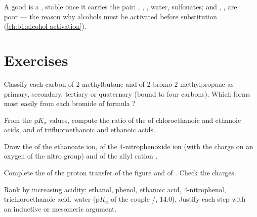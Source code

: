 A good  is a , stable once it carries the pair:
, , , water, sulfonates;  and , , are poor  --- the reason why alcohols must be
activated before substitution (\cref{ch:b1:alcohol-activation}).

\section{Exercises}

\begin{exercise}[$\star$]\label{exo:b1:electronic-effects:1}
Classify each carbon of 2-methylbutane and of 2-bromo-2-methylpropane as
primary, secondary, tertiary or quaternary (bound to four carbons). Which
 forms most easily from each bromide of formula ?
\end{exercise}

\begin{exercise}[$\star$]\label{exo:b1:electronic-effects:2}
From the $\mathrm{p}K_a$ values, compute the ratio of the  of chloroethanoic and ethanoic acids, and of trifluoroethanoic
and ethanoic acids.
\end{exercise}

\begin{exercise}[$\star$]\label{exo:b1:electronic-effects:3}
Draw the  of the ethanoate ion, of the 4-nitrophenoxide
ion (with the charge on an oxygen of the nitro group) and of the allyl
cation .
\end{exercise}

\begin{exercise}[$\star$]\label{exo:b1:electronic-effects:4}
Complete the  of the proton transfer of the figure and of
. Check the charges.
\end{exercise}

\begin{exercise}[$\star\star$]\label{exo:b1:electronic-effects:5}
Rank by increasing acidity: ethanol, phenol, ethanoic acid,
4-nitrophenol, trichloroethanoic acid, water ($\mathrm{p}K_a$ of the
couple /, 14.0). Justify each step with an inductive or
mesomeric argument.
\end{exercise}

